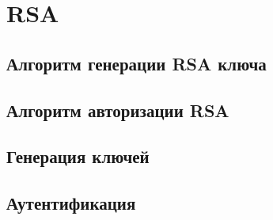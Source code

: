 \documentclass{article}
\begin{document}
\section{RSA}
\subsection{Алгоритм генерации RSA ключа}
\subsection{Алгоритм авторизации RSA}
\subsection{Генерация ключей}
\subsection{Аутентификация}
\end{document}
